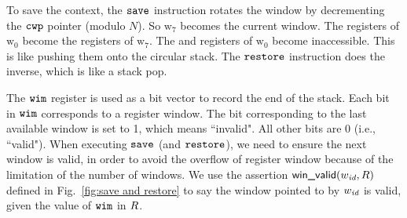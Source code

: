 To save the context, the $\texttt{save}$ instruction
rotates the window by decrementing the $\texttt{cwp}$ pointer
(modulo $N$).
So $\text{w}_7$ becomes the current window. The \outRN{}
registers of $\text{w}_0$ become
the \inRN{} registers of $\text{w}_7$.
The \inRN{} and \localRN{} registers of $\text{w}_0$
become inaccessible.
This is like pushing them
onto the circular stack.
The $\texttt{restore}$ instruction does the inverse, which is like
a stack pop.

The $\texttt{wim}$ register is used as a bit vector to record the
end of the stack. Each bit in $\texttt{wim}$ corresponds to a
register window. The bit corresponding to the last available
window is set to 1, which means ``invalid". All other bits
are 0 (i.e., ``valid").
When executing $\texttt{save}$ (and $\texttt{restore}$), we need to ensure
the next window is valid, in order to avoid the overflow
of register window because of the limitation of the number
of windows. We use the assertion $\textsf{win\_valid}{(}w_{\textit{id}}, R)$ defined
in Fig.~\ref{fig:save and restore} to say the
window pointed to by $w_{\textit{id}}$ is valid, given the value of
$\texttt{wim}$ in $R$.

